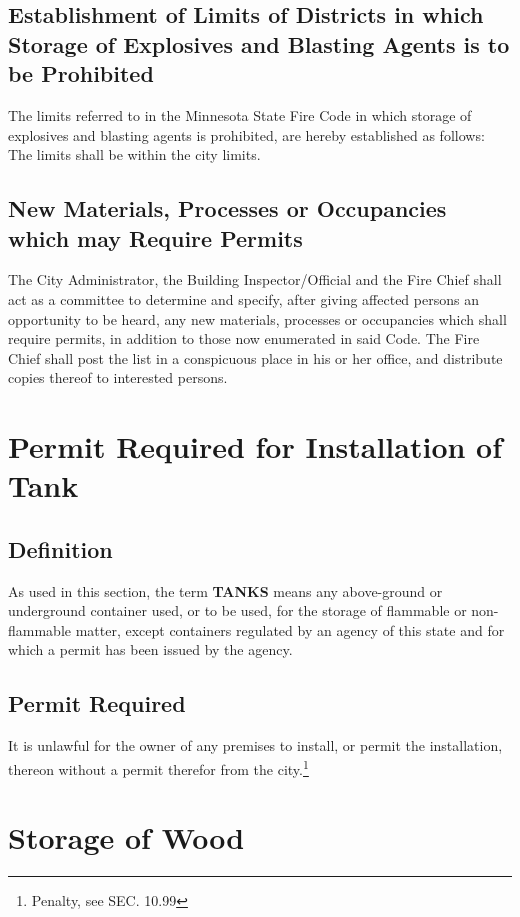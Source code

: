 \subsection{Establishment of Limits of Districts in which Storage of Explosives and Blasting Agents is to be Prohibited}
The limits referred to in the Minnesota State Fire Code in which storage of explosives and blasting agents is prohibited, are hereby established as follows: The limits shall be within the city limits.
\subsection{New Materials, Processes or Occupancies which may Require Permits}
The City Administrator, the Building Inspector/Official and the Fire Chief shall act as a committee to determine and specify, after giving affected persons an opportunity to be heard, any new materials, processes or occupancies which shall require permits, in addition to those now enumerated in said Code. The Fire Chief shall post the list in a conspicuous place in his or her office, and distribute copies thereof to interested persons.


\setcounter{section}{14}
\section{Permit Required for Installation of Tank}
\subsection{Definition}
As used in this section, the term \textbf{TANKS} means any above-ground or underground container used, or to be used, for the storage of flammable or non-flammable matter, except containers regulated by an agency of this state and for which a permit has been issued by the agency.
\subsection{Permit Required}
It is unlawful for the owner of any premises to install, or permit the installation, thereon without a permit therefor from the city.\footnote{Penalty, see SEC. 10.99}

\section{Storage of Wood}
